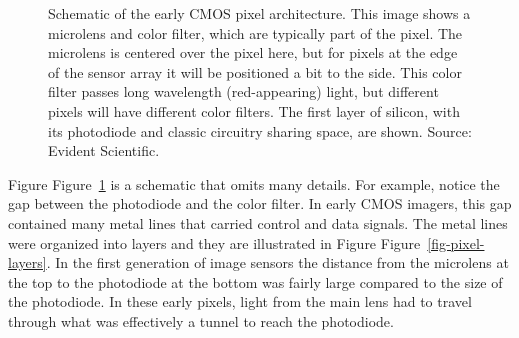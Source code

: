 \documentclass[
  letterpaper,
]{book}
\begin{document}
\begin{figure}


\caption{\label{fig-pixel-overview}Schematic of the early CMOS pixel
architecture. This image shows a microlens and color filter, which are
typically part of the pixel. The microlens is centered over the pixel
here, but for pixels at the edge of the sensor array it will be
positioned a bit to the side. This color filter passes long wavelength
(red-appearing) light, but different pixels will have different color
filters. The first layer of silicon, with its photodiode and classic
circuitry sharing space, are shown. Source: Evident Scientific.}

\end{figure}%

Figure Figure~\ref{fig-pixel-overview} is a schematic that omits many
details. For example, notice the gap between the photodiode and the
color filter. In early CMOS imagers, this gap contained many metal lines
that carried control and data signals. The metal lines were organized
into layers and they are illustrated in Figure
Figure~\ref{fig-pixel-layers}. In the first generation of image sensors
the distance from the microlens at the top to the photodiode at the
bottom was fairly large compared to the size of the photodiode. In these
early pixels, light from the main lens had to travel through what was
effectively a tunnel to reach the photodiode.
\end{document}
